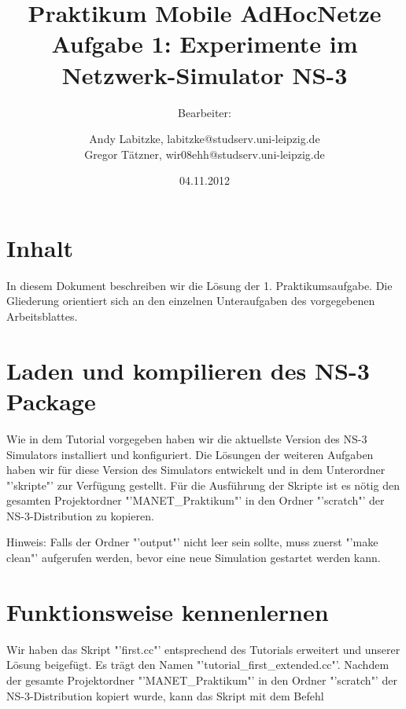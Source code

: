 \documentclass[12pt,a4paper,titlepage]{article}
\begin{document}
\title{Praktikum Mobile AdHocNetze\\
	Aufgabe 1: Experimente im Netzwerk-Simulator NS-3}
\author{
Bearbeiter: \and
	Andy Labitzke, labitzke@studserv.uni-leipzig.de \\ 
	Gregor Tätzner, wir08ehh@studserv.uni-leipzig.de}
\date{04.11.2012}
\maketitle
\setcounter{page}{1}
\appendix

\section*{Inhalt}
In diesem Dokument beschreiben wir die Lösung der 1. Praktikumsaufgabe. Die Gliederung orientiert sich an den einzelnen Unteraufgaben des vorgegebenen Arbeitsblattes.

\setcounter{section}{0}

\section{Laden und kompilieren des NS-3 Package}

Wie in dem Tutorial vorgegeben haben wir die aktuellste Version des NS-3 Simulators installiert und konfiguriert. Die Lösungen der weiteren Aufgaben haben wir für diese Version des Simulators entwickelt und in dem Unterordner "'skripte"' zur Verfügung gestellt. Für die Ausführung der Skripte ist es nötig den gesamten Projektordner "'MANET\_Praktikum"' in den Ordner "'scratch"' der NS-3-Distribution zu kopieren.

\begin{center}
Hinweis: Falls der Ordner "'output"' nicht leer sein sollte, muss zuerst "'make clean"' aufgerufen werden, bevor eine neue Simulation gestartet werden kann.
\end{center}

\section{Funktionsweise kennenlernen}

Wir haben das Skript "'first.cc"' entsprechend des Tutorials erweitert und unserer Lösung beigefügt. Es trägt den Namen "'tutorial\_first\_extended.cc"'.
Nachdem der gesamte Projektordner "'MANET\_Praktikum"' in den Ordner "'scratch"' der NS-3-Distribution kopiert wurde, kann das Skript mit dem Befehl
\end{document}
